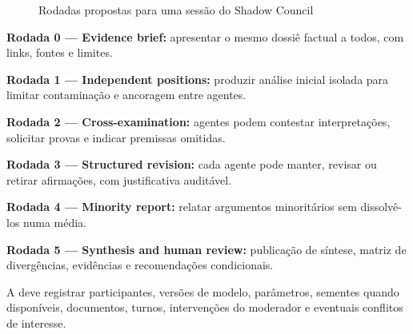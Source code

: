 \documentclass[12pt,a4paper,oneside,english,brazil]{abntex2}
\newcommand{\term}[1]{{\mdseries\ttfamily\small\seqsplit{#1}}}
\begin{document}
\begin{figure}[htbp]
\caption{Rodadas propostas para uma sessão do Shadow Council}\label{fig:rodadas}
\centering
{}
\end{figure}
\textbf{Rodada 0 --- Evidence brief:} apresentar o mesmo dossiê factual a todos, com links, fontes e limites.\par
\textbf{Rodada 1 --- Independent positions:} produzir análise inicial isolada para limitar contaminação e ancoragem entre agentes.\par
\textbf{Rodada 2 --- Cross-examination:} agentes podem contestar interpretações, solicitar provas e indicar premissas omitidas.\par
\textbf{Rodada 3 --- Structured revision:} cada agente pode manter, revisar ou retirar afirmações, com justificativa auditável.\par
\textbf{Rodada 4 --- Minority report:} relatar argumentos minoritários sem dissolvê-los numa média.\par
\textbf{Rodada 5 --- Synthesis and human review:} publicação de síntese, matriz de divergências, evidências e recomendações condicionais.\par
A \term{CouncilSession} deve registrar participantes, versões de modelo, parâmetros, sementes quando disponíveis, documentos, turnos, intervenções do moderador e eventuais conflitos de interesse.
\end{document}
